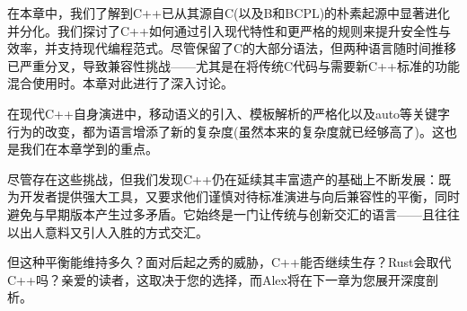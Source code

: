 在本章中，我们了解到C++已从其源自C(以及B和BCPL)的朴素起源中显著进化并分化。我们探讨了C++如何通过引入现代特性和更严格的规则来提升安全性与效率，并支持现代编程范式。尽管保留了C的大部分语法，但两种语言随时间推移已严重分叉，导致兼容性挑战——尤其是在将传统C代码与需要新C++标准的功能混合使用时。本章对此进行了深入讨论。

在现代C++自身演进中，移动语义的引入、模板解析的严格化以及auto等关键字行为的改变，都为语言增添了新的复杂度(虽然本来的复杂度就已经够高了)。这也是我们在本章学到的重点。

尽管存在这些挑战，但我们发现C++仍在延续其丰富遗产的基础上不断发展：既为开发者提供强大工具，又要求他们谨慎对待标准演进与向后兼容性的平衡，同时避免与早期版本产生过多矛盾。它始终是一门让传统与创新交汇的语言——且往往以出人意料又引人入胜的方式交汇。

但这种平衡能维持多久？面对后起之秀的威胁，C++能否继续生存？Rust会取代C++吗？亲爱的读者，这取决于您的选择，而Alex将在下一章为您展开深度剖析。
